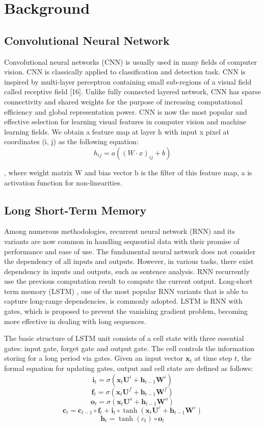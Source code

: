 \section{Background}
\subsection{Convolutional Neural Network}

Convolutional neural networks (CNN) is usually used in many fields of computer vision. CNN is classically applied to classification and detection task.
CNN is inspired by multi-layer perceptron containing small sub-regions of a visual field called receptive field [16]. 
Unlike fully connected layered network, CNN has sparse connectivity and shared weights for the purpose
of increasing computational efficiency and global representation power. CNN is now the most popular and effective selection for learning visual features in computer vision and machine learning fields. We obtain a feature map at layer h with input x pixel at coordinates (i, j) as the following equation:
\begin{equation}
h_{ij} = a((W \cdot x)_{ij}+b)
\end{equation}

, where weight matrix W and bias vector b is the filter of this feature map, a is activation function for non-linearities.
    
\subsection{Long Short-Term Memory}

Among numerous methodologies, recurrent neural network (RNN) and its variants are now common in handling sequential data with their promise of performance and ease of use. The fundamental neural network does not consider the dependency of all inputs and outputs. However, in various tasks, there exist dependency in inputs and outputs, such as sentence analysis. RNN recurrently use the previous computation result to compute the current output. Long-short term memory (LSTM) \cite{hochreiter1997long}, one of the most popular RNN variants that is able to capture long-range dependencies, is commonly adopted. LSTM is RNN with gates, which is proposed to prevent the vanishing gradient problem, becoming more effective in dealing with long sequences.

The basic structure of LSTM unit consists of a cell state with three essential gates: input gate, forget gate and output gate. The cell controls the information storing for a long period via gates. Given an input vector $\mathbf x_t$ at time step $t$, the formal equation for updating gates, output and cell state are defined as follows:
$$\mathbf i_t=\sigma\left({\mathbf x}_{t}{\mathbf U}^{i} + {\mathbf 
	h}_{t-1}{\mathbf W}^{i}\right)$$
$$\mathbf f_t=\sigma\left({\mathbf x}_{t}{\mathbf U}^{f} + {\mathbf 
	h}_{t-1}{\mathbf W}^{f}\right)$$
$$\mathbf o_t=\sigma\left({\mathbf x}_{t}{\mathbf U}^{o} + {\mathbf 
	h}_{t-1}{\mathbf W}^{o}\right)$$
$$\mathbf c_t=\mathbf c_{t-1}\circ \mathbf f_t + \mathbf i_t\circ 
\tanh\left({\mathbf x}_{t}{\mathbf U}^{c} + {\mathbf h}_{t-1}{\mathbf 
	W}^{c}\right)$$
$$\mathbf h_t=\tanh\left(c_t\right)\circ \mathbf o_t$$

